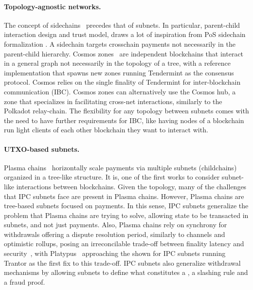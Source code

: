     \paragraph{Topology-agnostic networks.} The concept of sidechains~\cite{back2014enabling, gazi2019proof} precedes that of subnets. In particular, \ipc parent-child interaction design and \ipc trust model, draws a lot of inspiration from PoS sidechain formalization \cite{gazi2019proof}. A sidechain targets crosschain payments not necessarily in the parent-child hierarchy. Cosmos zones~\cite{cosmosdocs} are independent blockchains that interact in a general graph not necessarily in the topology of a tree, with a reference implementation that spawns new zones running Tendermint as the consensus protocol. Cosmos relies on the single finality of Tendermint for inter-blockchain communication (IBC). Cosmos zones can alternatively use the Cosmos hub, a zone that specializes in facilitating cross-net interactions, similarly to the Polkadot relay-chain. The flexibility for any topology between subnets comes with the need to have further requirements for IBC, like having nodes of a blockchain run light clients of each other blockchain they want to interact with.

    \paragraph{UTXO-based subnets.} Plasma chains~\cite{poon2017plasma} horizontally scale payments via multiple subnets (childchains) organized in a tree-like structure. It is, one of the first works to consider subnet-like interactions between blockchains. Given the topology, many of the challenges that IPC subnets face are present in Plasma chains. However, Plasma chains are tree-based subnets focused on payments. In this sense, IPC subnets generalize the problem that Plasma chains are trying to solve, allowing state to be transacted in subnets, and not just payments. Also, Plasma chains rely on synchrony for withdrawals offering a dispute resolution period, similarly to channels and optimistic rollups, posing an irreconcilable trade-off between finality latency and security~\cite{platypus2019ranchalpedrosa}, with Platypus~\cite{platypus2019ranchalpedrosa} approaching the \pof shown for IPC subnets running Trantor as the first fix to this trade-off. IPC subnets also generalize withdrawal mechanisms by allowing subnets to define what constitutes a \pof, a slashing rule and a fraud proof. 
    

